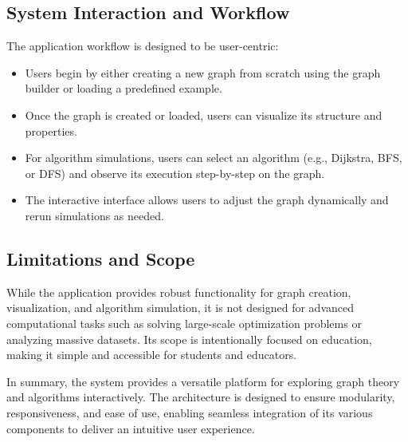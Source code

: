 \subsection{System Interaction and Workflow}
The application workflow is designed to be user-centric:
\begin{itemize}
    \item Users begin by either creating a new graph from scratch using the graph builder or loading a predefined example.
    \item Once the graph is created or loaded, users can visualize its structure and properties.
    \item For algorithm simulations, users can select an algorithm (e.g., Dijkstra, BFS, or DFS) and observe its execution step-by-step on the graph.
    \item The interactive interface allows users to adjust the graph dynamically and rerun simulations as needed.
\end{itemize}

\subsection{Limitations and Scope}
While the application provides robust functionality for graph creation, visualization, and algorithm simulation, it is not designed for advanced computational tasks such as solving large-scale optimization problems or analyzing massive datasets. Its scope is intentionally focused on education, making it simple and accessible for students and educators.

In summary, the system provides a versatile platform for exploring graph theory and algorithms interactively. The architecture is designed to ensure modularity, responsiveness, and ease of use, enabling seamless integration of its various components to deliver an intuitive user experience.

